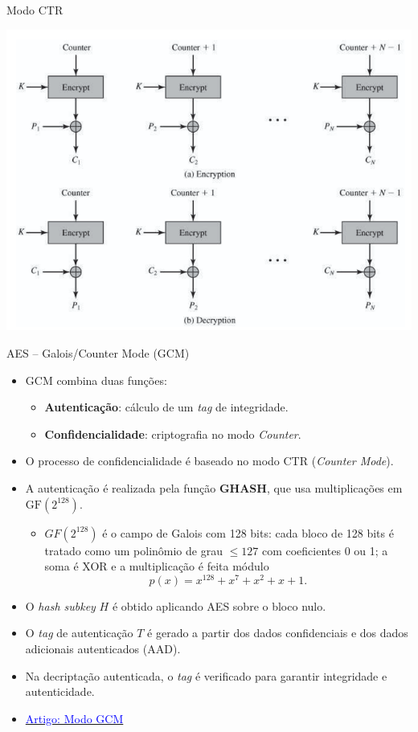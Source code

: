 \begin{frame}{Modo CTR}


\centering
    \includegraphics[width=0.6\linewidth]{Figuras/aes-modo-ctr.png}
    
\end{frame}

\begin{frame}{AES -- Galois/Counter Mode (GCM)}
    \begin{itemize}
        \item GCM combina duas funções: 
        \begin{itemize}
            \item \textbf{Autenticação}: cálculo de um \textit{tag} de integridade.
            \item \textbf{Confidencialidade}: criptografia no modo \textit{Counter}.
        \end{itemize}
        \item O processo de confidencialidade é baseado no modo CTR (\textit{Counter Mode}).
        \item A autenticação é realizada pela função \textbf{GHASH}, que usa multiplicações em $\text{GF}(2^{128})$.
        \begin{itemize}
            \item \(GF(2^{128})\) é o campo de Galois com 128 bits: cada bloco de 128 bits é tratado como um polinômio de grau \(\leq 127\) com coeficientes 0 ou 1; a soma é XOR e a multiplicação é feita módulo 
\[
p(x) = x^{128}+x^7+x^2+x+1.
\]
        \end{itemize}
        \item O \textit{hash subkey} $H$ é obtido aplicando AES sobre o bloco nulo.
        \item O \textit{tag} de autenticação $T$ é gerado a partir dos dados confidenciais e dos dados adicionais autenticados (AAD).
        \item Na decriptação autenticada, o \textit{tag} é verificado para garantir integridade e autenticidade.
        \item \href{https://ieeexplore.ieee.org/abstract/document/5953585?casa_token=4XfQGwEHfSEAAAAA:RZKOvTWEOaYpC0nIW8kEB8omke-XhdiG9iwkC4OEsp1yMXiZ6lIv6ckx9g_CffSJiCGgF9QCEg}{\textcolor{blue}{Artigo: Modo GCM}}
    \end{itemize}
\end{frame}

